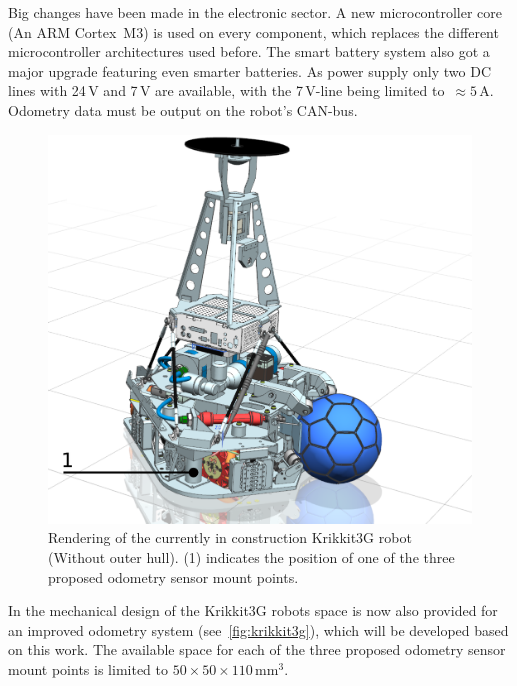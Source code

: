 \documentclass[12pt,a4paper]{article}
\begin{document}
Big changes have been made in the electronic sector.
A new microcontroller core (An ARM Cortex~M3) is used on every component, which replaces the different microcontroller architectures used before.
The smart battery system also got a major upgrade featuring even smarter batteries.
As power supply only two DC lines with 24\,V and 7\,V are available, with the 7\,V-line being limited to~$\approx5$\,A.
Odometry data must be output on the robot's CAN-bus.

\begin{figure}[htbp]
\begin{center}  
\includegraphics[width=0.7\columnwidth]{figures/Krikkit3G.pdf}
\caption{\label{fig:krikkit3g}
Rendering of the currently in construction Krikkit3G robot (Without outer hull).
(1) indicates the position of one of the three proposed odometry sensor mount points.
}   
\end{center}
\end{figure}

In the mechanical design of the Krikkit3G robots space is now also provided for an improved odometry system (see~\autoref{fig:krikkit3g}), which will be developed based on this work.
The available space for each of the three proposed odometry sensor mount points is limited to $50\times50\times110$\,mm$^3$.
\end{document}
